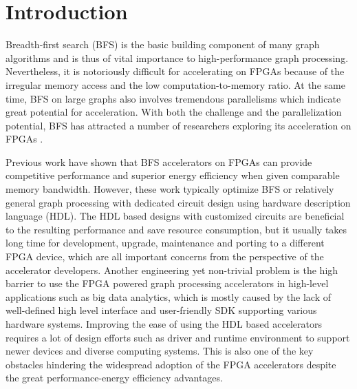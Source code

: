 \section{Introduction} \label{sec:intro}
Breadth-first search (BFS) is the basic building component of many graph algorithms 
and is thus of vital importance to high-performance graph processing. Nevertheless, 
it is notoriously difficult for accelerating on FPGAs because of the 
irregular memory access and the low computation-to-memory ratio. 
At the same time, BFS on large graphs also involves tremendous 
parallelisms which indicate great potential for acceleration. 
With both the challenge and the parallelization potential, 
BFS has attracted a number of researchers exploring its acceleration on FPGAs 
\cite{attia2014cygraph, betkaoui2012reconfigurable, Dai2017foregraph, Ma2017fpga,
umuroglu2015hybrid, oguntebi2016graphops, engelhardt2016gravf, zhou2016high}. 

Previous work have shown that BFS accelerators on FPGAs can provide competitive  
performance and superior energy efficiency when given comparable memory bandwidth. 
However, these work typically optimize BFS or relatively general graph processing 
with dedicated circuit design using hardware description language (HDL). The HDL 
based designs with customized circuits are beneficial to the resulting performance 
and save resource consumption, but it usually takes long time for development, 
upgrade, maintenance and porting to a different FPGA device, which are all 
important concerns from the perspective of the accelerator developers. Another 
engineering yet non-trivial problem is the high barrier to use the FPGA powered graph 
processing accelerators in high-level applications such as 
big data analytics, which is mostly caused by the lack of 
well-defined high level interface and user-friendly SDK supporting 
various hardware systems. Improving the ease of using the 
HDL based accelerators requires a lot of design efforts 
such as driver and runtime environment to support newer 
devices and diverse computing systems. This is also one of 
the key obstacles hindering the widespread adoption of 
the FPGA accelerators despite the great performance-energy 
efficiency advantages.

